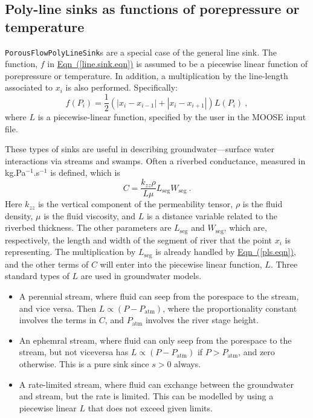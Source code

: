 \documentclass[12pt]{report}
\begin{document}
\subsection{Poly-line sinks as functions of porepressure or temperature}

{\tt PorousFlowPolyLineSink}s are a special case of the general line
sink.  The function, $f$ in
\hyperref[line.sink.eqn]{Eqn~(\ref*{line.sink.eqn})} is assumed to be
a piecewise linear function of porepressure or temperature.  In
addition, a multiplication by the line-length associated to $x_{i}$ is
also performed.  Specifically:
\begin{equation}
f(P_{i}) = \mbox{$\frac{1}{2}$}\left( |x_{i} - x_{i-1}| + |x_{i} - x_{i+1}|
\right) L(P_{i}) \ ,
\label{pls.eqn}
\end{equation}
where $L$ is a piecewise-linear function, specified by the user in the
MOOSE input file.

These types of sinks are useful in describing groundwater---surface
water interactions via streams and swamps.  Often a riverbed
conductance, measured in kg.Pa$^{-1}$.s$^{-1}$ is defined, which is
\begin{equation}
C = \frac{k_{zz}\rho}{L\mu}L_{\mathrm{seg}}W_{\mathrm{seg}} \ .
\end{equation}
Here $k_{zz}$ is the vertical component of the permeability tensor,
$\rho$ is the fluid density, $\mu$ is the fluid viscosity, and $L$ is
a distance variable related to the riverbed thickness.  The other
parameters are $L_{\mathrm{seg}}$ and $W_{\mathrm{seg}}$, which are,
respectively, the length and width of the segment of river that the
point $x_{i}$ is representing.  The multiplication by
$L_{\mathrm{seg}}$ is already handled by
\hyperref[pls.eqn]{Eqn~(\ref*{pls.eqn})}, and the other terms of $C$
will enter into the piecewise linear function, $L$.  Three standard
types of $L$ are used in groundwater models.
\begin{itemize}
\item A perennial stream, where fluid can seep from the porespace to
  the stream, and vice versa.  Then $L \propto (P -
  P_{\mathrm{atm}})$, where the proportionality constant involves the
  terms in $C$, and $P_{\mathrm{atm}}$ involves the river stage
  height.
\item An ephemral stream, where fluid can only seep from the porespace
  to the stream, but not viceversa has $L\propto (P-P_{\mathrm{atm}})$
  if $P>P_{\mathrm{atm}}$, and zero otherwise.  This is a pure sink
  since $s>0$ always.
\item A rate-limited stream, where fluid can exchange between the
  groundwater and stream, but the rate is limited.  This can be
  modelled by using a piecewise linear $L$ that does not exceed given
  limits.
\end{itemize}
\end{document}
